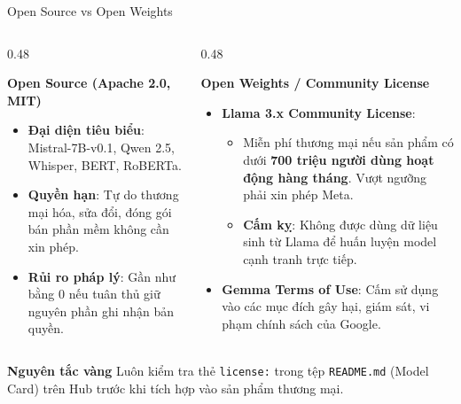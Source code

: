 \documentclass[aspectratio=169, 10pt]{beamer}
\begin{document}
\begin{frame}{Open Source vs Open Weights}
\begin{columns}[T]
  \begin{column}{0.48\textwidth}
    \begin{block}{\textbf{Open Source (Apache 2.0, MIT)}}
      \begin{itemize}
        \item \textbf{Đại diện tiêu biểu}: Mistral-7B-v0.1, Qwen 2.5, Whisper, BERT, RoBERTa.
        \item \textbf{Quyền hạn}: Tự do thương mại hóa, sửa đổi, đóng gói bán phần mềm không cần xin phép.
        \item \textbf{Rủi ro pháp lý}: Gần như bằng 0 nếu tuân thủ giữ nguyên phần ghi nhận bản quyền.
      \end{itemize}
    \end{block}
  \end{column}

  \begin{column}{0.48\textwidth}
    \begin{alertblock}{\textbf{Open Weights / Community License}}
      \begin{itemize}
        \item \textbf{Llama 3.x Community License}:
          \begin{itemize}
            \scriptsize
            \item Miễn phí thương mại nếu sản phẩm có dưới \textbf{700 triệu người dùng hoạt động hàng tháng}. Vượt ngưỡng phải xin phép Meta.
            \item \textbf{Cấm kỵ}: Không được dùng dữ liệu sinh từ Llama để huấn luyện model cạnh tranh trực tiếp.
          \end{itemize}
        \item \textbf{Gemma Terms of Use}: Cấm sử dụng vào các mục đích gây hại, giám sát, vi phạm chính sách của Google.
      \end{itemize}
    \end{alertblock}
  \end{column}
\end{columns}

\vspace{0.6em}
\begin{center}
\colorbox{hforange!15}{\parbox{0.96\textwidth}{
\centering \footnotesize \textbf{\textcolor{hfprimary}{ Nguyên tắc vàng}} Luôn kiểm tra thẻ \texttt{license:} trong tệp \texttt{README.md} (Model Card) trên Hub trước khi tích hợp vào sản phẩm thương mại.
}}
\end{center}
\end{frame}
\end{document}
